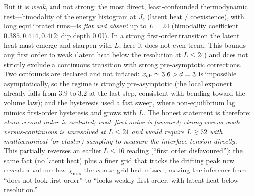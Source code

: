 \documentclass[aps,prd,reprint,nofootinbib,superscriptaddress,floatfix]{revtex4-2}
\begin{document}
But it is \emph{weak}, and not strong: the most direct, least-confounded thermodynamic
test---bimodality of the energy histogram at $J_c$ (latent heat / coexistence), with long
equilibrated runs---is \emph{flat and absent} up to $L=24$ (bimodality coefficient
$0.385,0.414,0.412$; dip depth $0.00$). In a strong first-order transition the latent
heat must emerge and sharpen with $L$; here it does not even trend. This bounds any first
order to weak (latent heat below the resolution at $L\le24$) and does not strictly exclude
a continuous transition with strong pre-asymptotic corrections. Two confounds are declared
and not inflated: $x_{\rm eff}\simeq3.6>d=3$ is impossible asymptotically, so the regime is
strongly pre-asymptotic (the local exponent already falls from $3.9$ to $3.2$ at the last
step, consistent with bending toward the volume law); and the hysteresis used a fast sweep,
where non-equilibrium lag mimics first-order hysteresis and grows with $L$. The honest
statement is therefore: \emph{clean second order is excluded; weak first order is favoured;
strong-versus-weak-versus-continuous is unresolved at $L\le24$ and would require
$L\gtrsim32$ with multicanonical (or cluster) sampling to measure the interface tension
directly.} This partially reverses an earlier $L\le16$ reading (``first order disfavoured''):
the same fact (no latent heat) plus a finer grid that tracks the drifting peak now reveals a
volume-law $\chi_{\max}$ the coarse grid had missed, moving the inference from ``does not look
first order'' to ``looks weakly first order, with latent heat below resolution.''
\end{document}
